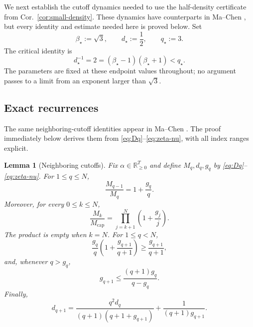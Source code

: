 \documentclass[11pt]{article}
\newtheorem{lemma}[theorem]{Lemma}
\theoremstyle{definition}
\theoremstyle{remark}
\newcommand{\R}{\mathbb{R}}
\newcommand{\rankmass}{M}
\newcommand{\rankdens}{d}
\newcommand{\rankgain}{g}
\newcommand{\criticalexp}{\beta_{\star}}
\newcommand{\threshold}{d_{\star}}
\newcommand{\rankcut}{q_{\star}}
\begin{document}
We next establish the cutoff dynamics needed to use the half-density
certificate from Cor.~\ref{cor:small-density}.  These dynamics have
counterparts in Ma--Chen \cite{machen2026}, but every identity and estimate
needed here is proved below.  Set
\begin{equation}
 \criticalexp:=\sqrt3,\qquad
 \threshold:=\frac12,\qquad
 \rankcut:=3.
 \label{eq:endpoint-parameters}
\end{equation}
The critical identity is
\begin{equation}
 \threshold^{-1}
 =2=(\criticalexp-1)(\criticalexp+1)<\rankcut.
 \label{eq:critical-identity}
\end{equation}
The parameters are fixed at these endpoint values throughout; no argument
passes to a limit from an exponent larger than \(\sqrt3\).

\subsection{Exact recurrences}

The same neighboring-cutoff identities appear in Ma--Chen
\cite[Lemma~6.2 and Appendix~B.2]{machen2026}.  The proof immediately below
derives them from \eqref{eq:Dq}--\eqref{eq:zeta-nu}, with all index ranges
explicit.

\begin{lemma}[Neighboring cutoffs]
\label{lem:rank-recurrences}
Fix \(\alpha\in\R_{\ge0}^T\) and define
\(\rankmass_q,\rankdens_q,\rankgain_q\) by
\eqref{eq:Dq}--\eqref{eq:zeta-nu}.  For \(1\le q\le N\),
\begin{equation}
 \frac{\rankmass_{q-1}}{\rankmass_q}
 =1+\frac{\rankgain_q}{q}.
 \label{eq:mass-step}
\end{equation}
Moreover, for every \(0\le k\le N\),
\begin{equation}
 \frac{\rankmass_k}{\rankmass_{\mathrm{cap}}}
 =\prod_{j=k+1}^N\left(1+\frac{\rankgain_j}{j}\right).
 \label{eq:mass-recurrences}
\end{equation}
The product is empty when \(k=N\).
For \(1\le q<N\),
\begin{equation}
 \frac{\rankgain_q}{q}
 \left(1+\frac{\rankgain_{q+1}}{q+1}\right)
 \ge\frac{\rankgain_{q+1}}{q+1},
 \label{eq:nu-transition}
\end{equation}
and, whenever \(q>\rankgain_q\),
\begin{equation}
 \rankgain_{q+1}
 \le\frac{(q+1)\rankgain_q}{q-\rankgain_q}.
 \label{eq:nu-upper}
\end{equation}
Finally,
\begin{equation}
 \rankdens_{q+1}
 =
 \frac{q^2\rankdens_q}
      {(q+1)(q+1+\rankgain_{q+1})}
 +\frac{1}{(q+1)\rankgain_{q+1}}.
 \label{eq:zeta-recurrence}
\end{equation}
\end{lemma}
\end{document}
